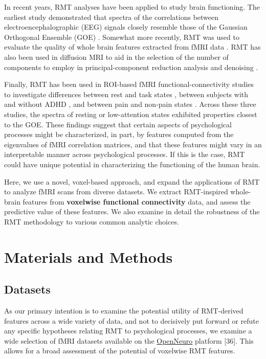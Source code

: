 \documentclass[10pt]{article}
\begin{document}
In recent years, RMT analyses have been applied to study brain functioning.  The earliest  study
demonstrated that spectra of the correlations between electroencephalographic (EEG) signals closely
resemble those of the Gaussian Orthogonal Ensemble (GOE) \citep{sebaRandomMatrixAnalysis2003}.
Somewhat more recently, RMT was used to evaluate the quality of whole brain features extracted from
fMRI data \citep{voultsidouFeatureEvaluationFMRI2007,verganiRestingStateFMRI2019}. RMT has also
been used in diffusion MRI to aid in the selection of the number of components to employ in
principal-component reduction analysis and denoising
\citep{veraartDenoisingDiffusionMRI2016,verganiRestingStateFMRI2019,ulfarssonDimensionEstimationNoisy2008}.

Finally, RMT has been used in ROI-based fMRI functional-connectivity studies to investigate
differences between rest and task states \citep{wangSpectralPropertiesTemporal2015}, between
subjects with and without ADHD \citep{wangRandomMatrixTheory2016}, and between pain and non-pain
states \citep{matharooSpontaneousBackpainAlters2020}. Across these three studies, the spectra of
resting or low-attention states exhibited properties closest to the GOE. These findings suggest that
certain aspects of psychological processes might be characterized, in part, by features computed
from the eigenvalues of fMRI correlation matrices, and that these features might vary in an
interpretable manner across psychological processes. If this is the case, RMT could have unique
potential in characterizing the functioning of the human brain.

Here, we use a novel, voxel-based approach, and expand the applications of RMT to analyze fMRI scans
from  diverse datasets. We extract RMT-inspired whole-brain features from \textbf{voxelwise
functional connectivity} data, and assess the predictive value of these features. We also examine in
detail the robustness of the RMT methodology to various common analytic choices.

\section{Materials and Methods}

\subsection{Datasets}

As our primary intention is to examine the potential utility of RMT-derived features across a wide
variety of data, and not to decisively put forward or refute any specific hypotheses relating RMT to
psychological processes, we examine a wide selection of fMRI datasets available on the
\href{https://openneuro.org/}{OpenNeuro} platform [36].  This allows for a broad assessment of the
potential of voxelwise RMT features.
\end{document}
